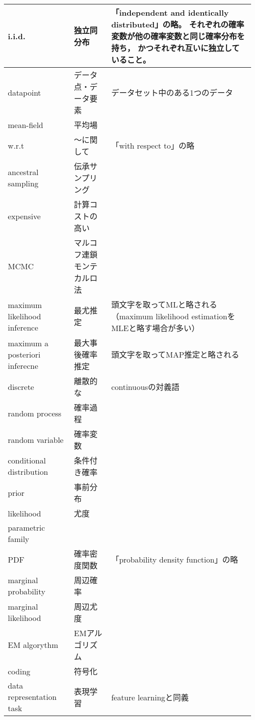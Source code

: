 \documentclass[dvipdfmx, fleqn]{jsarticle}
\begin{document}
\begin{longtable}{lp{4cm}p{7cm}}
            \tabularnewline \hline
        i.i.d.
            & 独立同分布
            & 「independent and identically distributed」の略。
            それぞれの確率変数が他の確率変数と同じ確率分布を持ち，
            かつそれぞれ互いに独立していること。
            \tabularnewline \hline
        datapoint
            & データ点・データ要素
            & データセット中のある1つのデータ
            \tabularnewline \hline
        mean-field
            & 平均場
            & 
            \tabularnewline \hline
        w.r.t
            & ～に関して
            & 「with respect to」の略
            \tabularnewline \hline
        ancestral sampling
            & 伝承サンプリング
            & 
            \tabularnewline \hline
        expensive
            & 計算コストの高い
            & 
            \tabularnewline \hline
        MCMC
            & マルコフ連鎖モンテカルロ法
            & 
            \tabularnewline \hline
        maximum likelihood inference
            & 最尤推定
            & 頭文字を取ってMLと略される
            （maximum likelihood estimationをMLEと略す場合が多い）
            \tabularnewline \hline
        maximum a posteriori inferecne
            & 最大事後確率推定
            & 頭文字を取ってMAP推定と略される
            \tabularnewline \hline
        discrete
            & 離散的な
            & continuousの対義語
            \tabularnewline \hline
        random process
            & 確率過程
            & 
            \tabularnewline \hline
        random variable
            & 確率変数
            & 
            \tabularnewline \hline
        conditional distribution
            & 条件付き確率
            & 
            \tabularnewline \hline
        prior
            & 事前分布
            & 
            \tabularnewline \hline
        likelihood
            & 尤度
            & 
            \tabularnewline \hline
        parametric family
            & 
            & 
            \tabularnewline \hline
        PDF
            & 確率密度関数
            & 「probability density function」の略
            \tabularnewline \hline
        marginal probability
            & 周辺確率
            & 
            \tabularnewline \hline
        marginal likelihood
            & 周辺尤度
            & 
            \tabularnewline \hline
        EM algorythm
            & EMアルゴリズム
            & 
            \tabularnewline \hline
        coding
            & 符号化
            & 
            \tabularnewline \hline
        data representation task
            & 表現学習
            & feature learningと同義
            \tabularnewline \hline

\end{longtable}
\end{document}
